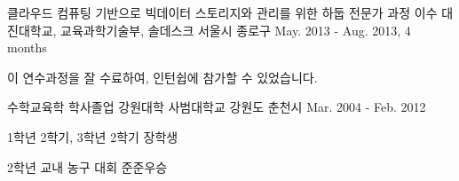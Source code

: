 

\begin{cventries}

  \cventry
    {클라우드 컴퓨팅 기반으로 빅데이터 스토리지와 관리를 위한 하둡 전문가 과정 이수} %
    {대진대학교, 교육과학기술부, 솔데스크} %
    {서울시 종로구} %
    {May. 2013 - Aug. 2013, 4 months} %
    {
      \begin{cvitems} %
        \item {이 연수과정을 잘 수료하여, 인턴쉽에 참가할 수 있었습니다.}
      \end{cvitems}
    }

  \cventry
    {수학교육학 학사졸업} %
    {강원대학 사범대학교} %
    {강원도 춘천시} %
    {Mar. 2004 - Feb. 2012} %
    {
      \begin{cvitems} %
        \item {1학년 2학기, 3학년 2학기 장학생}
        \item {2학년 교내 농구 대회 준준우승}
      \end{cvitems}
    }

\end{cventries}
